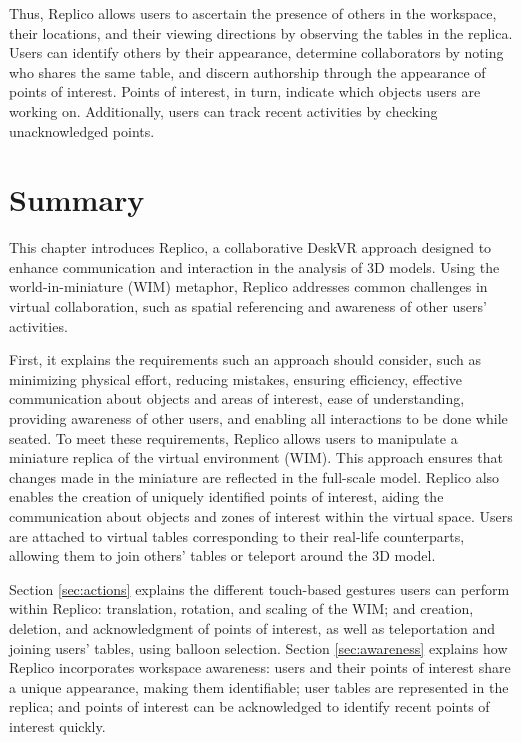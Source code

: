     Thus, Replico allows users to ascertain the presence of others in the workspace, their locations, and their viewing directions by observing the tables in the replica. Users can identify others by their appearance, determine collaborators by noting who shares the same table, and discern authorship through the appearance of points of interest. Points of interest, in turn, indicate which objects users are working on. Additionally, users can track recent activities by checking unacknowledged points.

\section{Summary}
    This chapter introduces Replico, a collaborative DeskVR approach designed to enhance communication and interaction in the analysis of 3D models. Using the world-in-miniature (WIM) metaphor, Replico addresses common challenges in virtual collaboration, such as spatial referencing and awareness of other users' activities.

    First, it explains the requirements such an approach should consider, such as minimizing physical effort, reducing mistakes, ensuring efficiency, effective communication about objects and areas of interest, ease of understanding, providing awareness of other users, and enabling all interactions to be done while seated. To meet these requirements, Replico allows users to manipulate a miniature replica of the virtual environment (WIM). This approach ensures that changes made in the miniature are reflected in the full-scale model. Replico also enables the creation of uniquely identified points of interest, aiding the communication about objects and zones of interest within the virtual space. Users are attached to virtual tables corresponding to their real-life counterparts, allowing them to join others' tables or teleport around the 3D model.

    Section \ref{sec:actions} explains the different touch-based gestures users can perform within Replico: translation, rotation, and scaling of the WIM; and creation, deletion, and acknowledgment of points of interest, as well as teleportation and joining users' tables, using balloon selection. Section \ref{sec:awareness} explains how Replico incorporates workspace awareness: users and their points of interest share a unique appearance, making them identifiable; user tables are represented in the replica; and points of interest can be acknowledged to identify recent points of interest quickly.